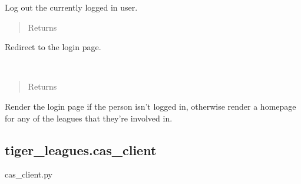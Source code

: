 \documentclass[letterpaper,10pt,english]{sphinxmanual}
\begin{document}

\begin{fulllineitems}
\label{\detokenize{tiger_leagues/readme:tiger_leagues.auth.cas_logout}}
Log out the currently logged in user.
\begin{quote}\begin{description}
\item[{Returns}] \leavevmode
{}

\end{description}\end{quote}

Redirect to the login page.

\end{fulllineitems}


\begin{fulllineitems}
\label{\detokenize{tiger_leagues/readme:tiger_leagues.auth.index}}~\begin{quote}\begin{description}
\item[{Returns}] \leavevmode
{}

\end{description}\end{quote}

Render the login page if the person isn’t logged in, otherwise render a 
homepage for any of the leagues that they’re involved in.

\end{fulllineitems}



\subsection{tiger\_leagues.cas\_client}
\label{\detokenize{tiger_leagues/readme:module-tiger_leagues.cas_client}}\label{\detokenize{tiger_leagues/readme:tiger-leagues-cas-client}}
cas\_client.py
\end{document}
